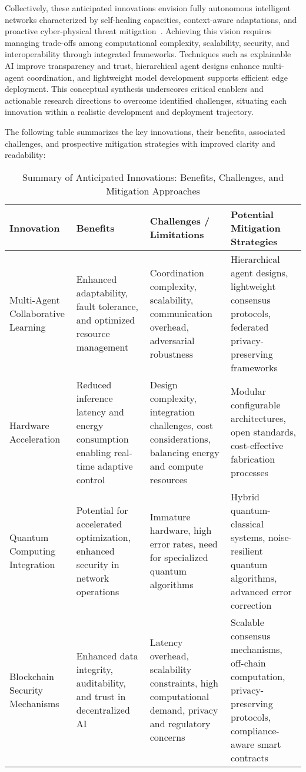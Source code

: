 \documentclass[sigconf]{acmart}
\begin{document}
Collectively, these anticipated innovations envision fully autonomous intelligent networks characterized by self-healing capacities, context-aware adaptations, and proactive cyber-physical threat mitigation~\cite{ref55}. Achieving this vision requires managing trade-offs among computational complexity, scalability, security, and interoperability through integrated frameworks. Techniques such as explainable AI improve transparency and trust, hierarchical agent designs enhance multi-agent coordination, and lightweight model development supports efficient edge deployment. This conceptual synthesis underscores critical enablers and actionable research directions to overcome identified challenges, situating each innovation within a realistic development and deployment trajectory.

\bigskip

The following table summarizes the key innovations, their benefits, associated challenges, and prospective mitigation strategies with improved clarity and readability:

\begin{table*}[htbp]
\centering
\caption{Summary of Anticipated Innovations: Benefits, Challenges, and Mitigation Approaches}
\label{tab:anticipated_innovations}
\begin{adjustbox}{max width=\textwidth}
\begin{tabular}{@{}llll@{}}
\toprule
\textbf{Innovation} &
  \textbf{Benefits} &
  \textbf{Challenges / Limitations} &
  \textbf{Potential Mitigation Strategies} \\ \midrule
Multi-Agent Collaborative Learning &
  Enhanced adaptability, fault tolerance, and optimized resource management~\cite{ref49,ref54} &
  Coordination complexity, scalability, communication overhead, adversarial robustness &
  Hierarchical agent designs, lightweight consensus protocols, federated privacy-preserving frameworks \\
Hardware Acceleration &
  Reduced inference latency and energy consumption enabling real-time adaptive control~\cite{ref50} &
  Design complexity, integration challenges, cost considerations, balancing energy and compute resources &
  Modular configurable architectures, open standards, cost-effective fabrication processes \\
Quantum Computing Integration &
  Potential for accelerated optimization, enhanced security in network operations &
  Immature hardware, high error rates, need for specialized quantum algorithms &
  Hybrid quantum-classical systems, noise-resilient quantum algorithms, advanced error correction \\
Blockchain Security Mechanisms &
  Enhanced data integrity, auditability, and trust in decentralized AI~\cite{ref54} &
  Latency overhead, scalability constraints, high computational demand, privacy and regulatory concerns &
  Scalable consensus mechanisms, off-chain computation, privacy-preserving protocols, compliance-aware smart contracts \\
\bottomrule
\end{tabular}
\end{adjustbox}
\end{table*}
\end{document}
